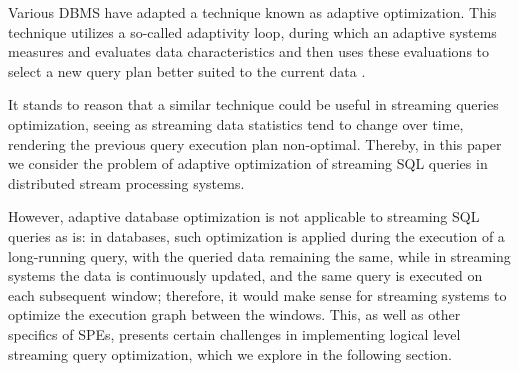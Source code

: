 Various DBMS have adapted a technique known as adaptive optimization. This technique utilizes a so-called adaptivity loop, during which an adaptive systems measures and evaluates data characteristics and then uses these evaluations to select a new query plan better suited to the current data \cite{deshpande2007adaptive}. 


It stands to reason that a similar technique could be useful in streaming queries optimization, seeing as streaming data statistics tend to change over time, rendering the previous query execution plan non-optimal. Thereby, in this paper we consider the problem of adaptive optimization of streaming SQL queries in distributed stream processing systems. 


However, adaptive database optimization is not applicable to streaming SQL queries as is: in databases, such optimization is applied during the execution of a long-running query, with the queried data remaining the same, while in streaming systems the data is continuously updated, and the same query is executed on each subsequent window; therefore, it would make sense for streaming systems to optimize the execution graph between the windows. This, as well as other specifics of SPEs, presents certain challenges in implementing logical level streaming query optimization, which we explore in the following section.

